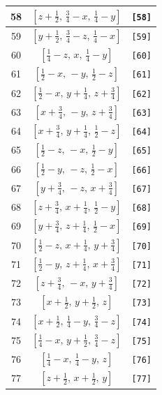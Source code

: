 \documentclass[fleqn,8pt]{jsarticle}
\begin{document}
\begin{longtable}{ccc}
58 & $\left[ z + \frac{1}{2},\, \frac{3}{4} - x,\, \frac{1}{4} - y \right]$ & {\tt [58]} \\ \hline
59 & $\left[ y + \frac{1}{2},\, \frac{3}{4} - z,\, \frac{1}{4} - x \right]$ & {\tt [59]} \\ \hline
60 & $\left[ \frac{1}{4} - z,\, x,\, \frac{1}{4} - y \right]$ & {\tt [60]} \\ \hline
61 & $\left[ \frac{1}{2} - x,\, - y,\, \frac{1}{2} - z \right]$ & {\tt [61]} \\ \hline
62 & $\left[ \frac{1}{2} - x,\, y + \frac{1}{4},\, z + \frac{3}{4} \right]$ & {\tt [62]} \\ \hline
63 & $\left[ x + \frac{3}{4},\, - y,\, z + \frac{3}{4} \right]$ & {\tt [63]} \\ \hline
64 & $\left[ x + \frac{3}{4},\, y + \frac{1}{4},\, \frac{1}{2} - z \right]$ & {\tt [64]} \\ \hline
65 & $\left[ \frac{1}{2} - z,\, - x,\, \frac{1}{2} - y \right]$ & {\tt [65]} \\ \hline
66 & $\left[ \frac{1}{2} - y,\, - z,\, \frac{1}{2} - x \right]$ & {\tt [66]} \\ \hline
67 & $\left[ y + \frac{3}{4},\, - z,\, x + \frac{3}{4} \right]$ & {\tt [67]} \\ \hline
68 & $\left[ z + \frac{3}{4},\, x + \frac{1}{4},\, \frac{1}{2} - y \right]$ & {\tt [68]} \\ \hline
69 & $\left[ y + \frac{3}{4},\, z + \frac{1}{4},\, \frac{1}{2} - x \right]$ & {\tt [69]} \\ \hline
70 & $\left[ \frac{1}{2} - z,\, x + \frac{1}{4},\, y + \frac{3}{4} \right]$ & {\tt [70]} \\ \hline
71 & $\left[ \frac{1}{2} - y,\, z + \frac{1}{4},\, x + \frac{3}{4} \right]$ & {\tt [71]} \\ \hline
72 & $\left[ z + \frac{3}{4},\, - x,\, y + \frac{3}{4} \right]$ & {\tt [72]} \\ \hline
73 & $\left[ x + \frac{1}{2},\, y + \frac{1}{2},\, z \right]$ & {\tt [73]} \\ \hline
74 & $\left[ x + \frac{1}{2},\, \frac{1}{4} - y,\, \frac{3}{4} - z \right]$ & {\tt [74]} \\ \hline
75 & $\left[ \frac{1}{4} - x,\, y + \frac{1}{2},\, \frac{3}{4} - z \right]$ & {\tt [75]} \\ \hline
76 & $\left[ \frac{1}{4} - x,\, \frac{1}{4} - y,\, z \right]$ & {\tt [76]} \\ \hline
77 & $\left[ z + \frac{1}{2},\, x + \frac{1}{2},\, y \right]$ & {\tt [77]} \\ \hline

\end{longtable}
\end{document}
